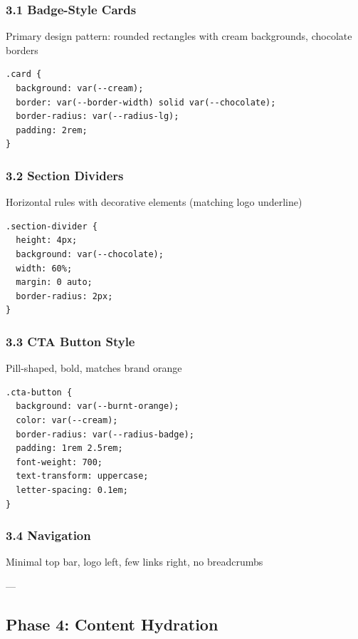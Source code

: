 \documentclass{book}
\begin{document}
\begin{itemize}
\begin{itemize}
\begin{itemize}
\begin{itemize}
\begin{itemize}
\begin{itemize}
\begin{itemize}
\begin{itemize}
\begin{itemize}
\begin{itemize}
\begin{itemize}
\begin{itemize}
\begin{itemize}
\subsubsection{3.1 Badge-Style Cards}
Primary design pattern: rounded rectangles with cream backgrounds, chocolate borders

\begin{verbatim}
.card {
  background: var(--cream);
  border: var(--border-width) solid var(--chocolate);
  border-radius: var(--radius-lg);
  padding: 2rem;
}

\end{verbatim}

\subsubsection{3.2 Section Dividers}
Horizontal rules with decorative elements (matching logo underline)

\begin{verbatim}
.section-divider {
  height: 4px;
  background: var(--chocolate);
  width: 60%;
  margin: 0 auto;
  border-radius: 2px;
}

\end{verbatim}

\subsubsection{3.3 CTA Button Style}
Pill-shaped, bold, matches brand orange

\begin{verbatim}
.cta-button {
  background: var(--burnt-orange);
  color: var(--cream);
  border-radius: var(--radius-badge);
  padding: 1rem 2.5rem;
  font-weight: 700;
  text-transform: uppercase;
  letter-spacing: 0.1em;
}

\end{verbatim}

\subsubsection{3.4 Navigation}
Minimal top bar, logo left, few links right, no breadcrumbs

---

\subsection{Phase 4: Content Hydration}


\end{itemize}
\end{itemize}
\end{itemize}
\end{itemize}
\end{itemize}
\end{itemize}
\end{itemize}
\end{itemize}
\end{itemize}
\end{itemize}
\end{itemize}
\end{itemize}
\end{itemize}
\end{document}
